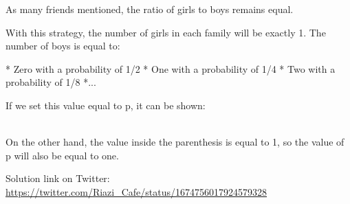 \begin{solution}
As many friends mentioned, the ratio of girls to boys remains equal.

With this strategy, the number of girls in each family will be exactly 1. The number of boys is equal to:

* Zero with a probability of 1/2
* One with a probability of 1/4
* Two with a probability of 1/8
*...

If we set this value equal to p, it can be shown:

\\[2 \times p - (\frac{1}{2} + \frac{1}{4} + \frac{1}{8} + ...) = p\\]

On the other hand, the value inside the parenthesis is equal to 1, so the value of p will also be equal to one.


Solution link on Twitter:  \href{https://twitter.com/Riazi_Cafe/status/1674756017924579328}{https://twitter.com/Riazi_Cafe/status/1674756017924579328}\end{solution}